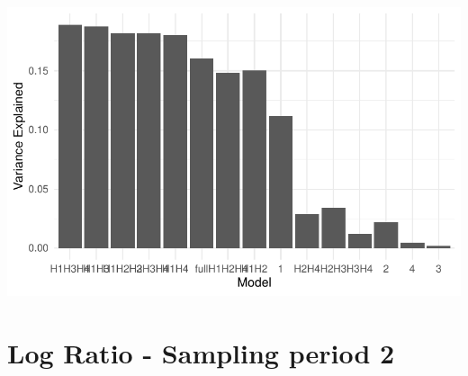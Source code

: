 \documentclass[
  letterpaper,
  DIV=11,
  numbers=noendperiod]{scrreprt}
\begin{document}
\includegraphics{05_VarPart_files/figure-pdf/var-part-ranger-performance-eval-LR1-1.pdf}

\section{Log Ratio - Sampling period 2}
\end{document}
